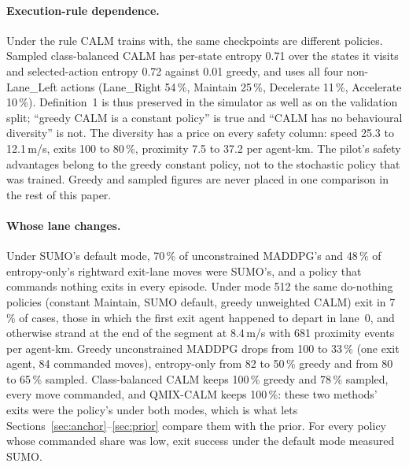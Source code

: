 \paragraph{Execution-rule dependence.}
Under the rule CALM trains with, the same checkpoints are different policies. Sampled class-balanced CALM has per-state entropy 0.71 over the states it visits and selected-action entropy 0.72 against 0.01 greedy, and uses all four non-Lane\_Left actions (Lane\_Right 54\,\%, Maintain 25\,\%, Decelerate 11\,\%, Accelerate 10\,\%). Definition~1 is thus preserved in the simulator as well as on the validation split; ``greedy CALM is a constant policy'' is true and ``CALM has no behavioural diversity'' is not. The diversity has a price on every safety column: speed 25.3 to 12.1\,m/s, exits 100 to 80\,\%, proximity 7.5 to 37.2 per agent-km. The pilot's safety advantages belong to the greedy constant policy, not to the stochastic policy that was trained. Greedy and sampled figures are never placed in one comparison in the rest of this paper.

\paragraph{Whose lane changes.}
Under SUMO's default mode, 70\,\% of unconstrained MADDPG's and 48\,\% of entropy-only's rightward exit-lane moves were SUMO's, and a policy that commands nothing exits in every episode. Under mode 512 the same do-nothing policies (constant Maintain, SUMO default, greedy unweighted CALM) exit in 7\,\% of cases, those in which the first exit agent happened to depart in lane~0, and otherwise strand at the end of the segment at 8.4\,m/s with 681 proximity events per agent-km. Greedy unconstrained MADDPG drops from 100 to 33\,\% (one exit agent, 84 commanded moves), entropy-only from 82 to 50\,\% greedy and from 80 to 65\,\% sampled. Class-balanced CALM keeps 100\,\% greedy and 78\,\% sampled, every move commanded, and QMIX-CALM keeps 100\,\%: these two methods' exits were the policy's under both modes, which is what lets Sections~\ref{sec:anchor}--\ref{sec:prior} compare them with the prior. For every policy whose commanded share was low, exit success under the default mode measured SUMO.

